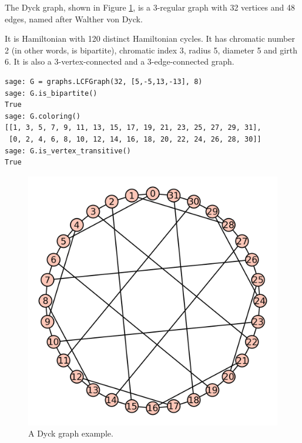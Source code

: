 \begin{example}
\label{example:graph_coloring:dyck_graph_example}
The Dyck graph, shown in Figure \ref{fig:graph_coloring:dyck_graph_example},
is a 3-regular graph with 32 vertices and 48 edges,
named after Walther von Dyck.

It is Hamiltonian with 120 distinct Hamiltonian cycles. It has
chromatic number 2 (in other words, is bipartite),
chromatic index 3, radius 5, diameter 5 and girth
6. It is also a 3-vertex-connected and a 3-edge-connected graph.

\begin{lstlisting}
sage: G = graphs.LCFGraph(32, [5,-5,13,-13], 8)
sage: G.is_bipartite()
True
sage: G.coloring()
[[1, 3, 5, 7, 9, 11, 13, 15, 17, 19, 21, 23, 25, 27, 29, 31],
 [0, 2, 4, 6, 8, 10, 12, 14, 16, 18, 20, 22, 24, 26, 28, 30]]
sage: G.is_vertex_transitive()
True
\end{lstlisting}


\begin{figure}[!htbp]
\centering
{}
\includegraphics{image/graph-coloring/dyck-graph-example}
\caption{A Dyck graph example.}
\label{fig:graph_coloring:dyck_graph_example}
\end{figure}

\end{example}


